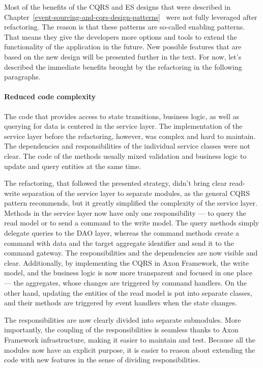\documentclass{book}
\begin{document}
Most of the benefits of the CQRS and ES designs that were described in Chapter~\ref{event-sourcing-and-cqrs-design-patterns}~ were not fully
leveraged after refactoring. The reason is that these patterns are
so-called enabling patterns. That means they give the developers more
options and tools to extend the functionality of the application in the
future. New possible features that are based on the new design will be
presented further in the text. For now, let's described the immediate
benefits brought by the refactoring in the following paragraphs.

\paragraph{Reduced code complexity}\label{reduced-code-complexity}

The code that provides access to state transitions, business logic, as
well as querying for data is centered in the service layer. The
implementation of the service layer before the refactoring, however, was
complex and hard to maintain. The dependencies and responsibilities of
the individual service classes were not clear. The code of the methods
usually mixed validation and business logic to update and query entities
at the same time.

The refactoring, that followed the presented strategy, didn't bring
clear read-write separation of the service layer to separate modules, as
the general CQRS pattern recommends, but it greatly simplified the
complexity of the service layer. Methods in the service layer now have
only one responsibility --- to query the read model or to send a command
to the write model. The query methods simply delegate queries to the DAO
layer, whereas the command methods create a command with data and the
target aggregate identifier and send it to the command gateway. The
responsibilities and the dependencies are now visible and clear.
Additionally, by implementing the CQRS in Axon Framework, the write
model, and the business logic is now more transparent and focused in one
place --- the aggregates, whose changes are triggered by command
handlers. On the other hand, updating the entities of the read model
is put into separate classes, and their methods are triggered by event
handlers when the state changes.

The responsibilities are now clearly divided into separate submodules.
More importantly, the coupling of the responsibilities is seamless
thanks to Axon Framework infrastructure, making it easier to maintain
and test. Because all the modules now have an explicit purpose, it is
easier to reason about extending the code with new features in the sense
of dividing responsibilities.
\end{document}
